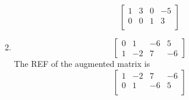 \begin{enumerate}[(a)]
\begin{enumerate}[i]
$$        \left[
            \begin{array}{ccc|c}
             1 & 3 & 0 & -5 \\
             0 & 0 & 1 & 3 \\
            \end{array}
        \right]
        $$
        \item
        $$
        \left[\begin{array}{rrr|r}0 & 1 & -6 & 5 \\ 1 & -2 & 7 & -6\end{array}\right]
        $$
        The REF of the augmented matrix is
        $$
        \left[
            \begin{array}{ccc|c}
             1 & -2 & 7 & -6 \\
             0 & 1 & -6 & 5 \\
            \end{array}
        \right]
        $$
    \end{enumerate}
    
 \end{enumerate}   
